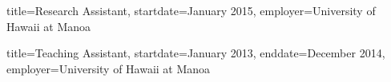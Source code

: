 \documentclass{resume}
\begin{document}
\begin{job}{title=Research Assistant,
            startdate=January 2015,
            employer=University of Hawaii at Manoa}
\end{job}

\begin{job}{title=Teaching Assistant,
            startdate=January 2013,
            enddate=December 2014,
            employer=University of Hawaii at Manoa}
\end{job}
\end{document}
